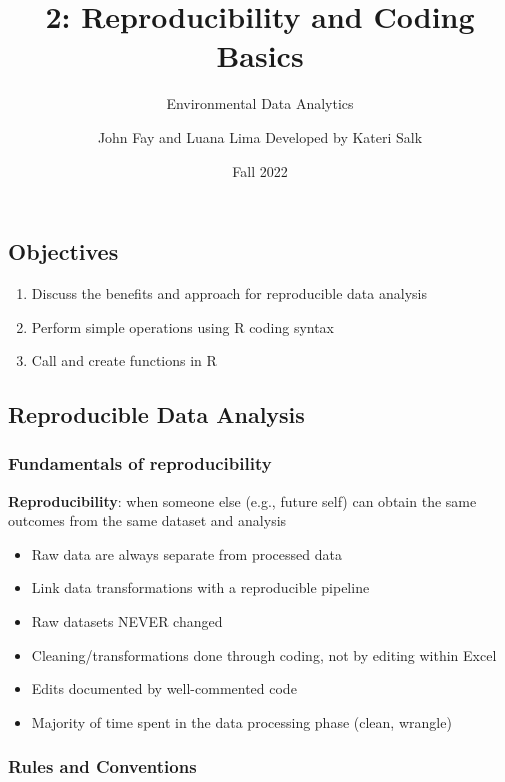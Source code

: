 \documentclass[
]{article}
\title{2: Reproducibility and Coding Basics}
\subtitle{Environmental Data Analytics}
\author{John Fay and Luana Lima \textbar{} Developed by Kateri Salk}
\date{Fall 2022}
\providecommand{\tightlist}{%
  \setlength{\itemsep}{0pt}\setlength{\parskip}{0pt}}
\begin{document}
\maketitle

\hypertarget{objectives}{%
\subsection{Objectives}\label{objectives}}

\begin{enumerate}
\def\labelenumi{\arabic{enumi}.}
\tightlist
\item
  Discuss the benefits and approach for reproducible data analysis
\item
  Perform simple operations using R coding syntax
\item
  Call and create functions in R
\end{enumerate}

\hypertarget{reproducible-data-analysis}{%
\subsection{Reproducible Data
Analysis}\label{reproducible-data-analysis}}

\hypertarget{fundamentals-of-reproducibility}{%
\subsubsection{Fundamentals of
reproducibility}\label{fundamentals-of-reproducibility}}

\textbf{Reproducibility}: when someone else (e.g., future self) can
obtain the same outcomes from the same dataset and analysis

\begin{itemize}
\tightlist
\item
  Raw data are always separate from processed data
\item
  Link data transformations with a reproducible pipeline
\item
  Raw datasets NEVER changed
\item
  Cleaning/transformations done through coding, not by editing within
  Excel
\item
  Edits documented by well-commented code
\item
  Majority of time spent in the data processing phase (clean, wrangle)
\end{itemize}

\hypertarget{rules-and-conventions}{%
\subsubsection{Rules and Conventions}\label{rules-and-conventions}}
\end{document}
